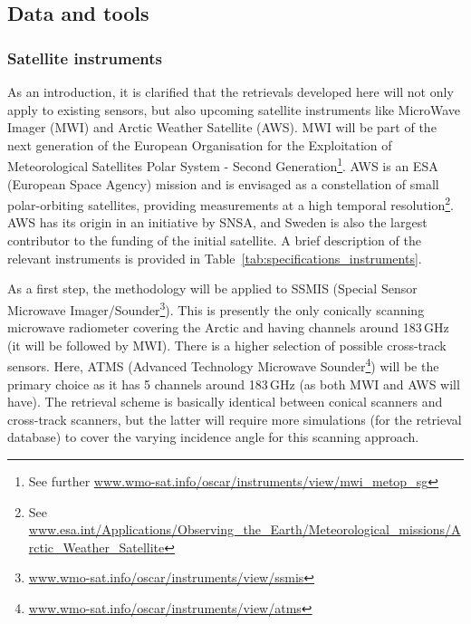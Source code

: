 \documentclass[12pt,oneside,a4paper]{article}
\begin{document}
\subsection{Data and tools}
% 
\subsubsection{Satellite instruments}

As an introduction, it is clarified that the retrievals developed here will not
only apply to existing sensors, but also upcoming satellite
instruments like MicroWave Imager (MWI) and Arctic Weather Satellite (AWS). MWI
will be part of the next generation of the European Organisation for the
Exploitation of Meteorological Satellites Polar System - Second
Generation\footnote{See further
  \url{www.wmo-sat.info/oscar/instruments/view/mwi_metop_sg}}. AWS is an ESA (European Space Agency)
mission and is envisaged as a constellation of small polar-orbiting satellites,
providing measurements at a high temporal resolution\footnote{See
  \url{www.esa.int/Applications/Observing_the_Earth/Meteorological_missions/Arctic_Weather_Satellite}}.
AWS has its origin in an initiative by SNSA, and Sweden is also the largest
contributor to the funding of the initial satellite. A brief description of the
relevant instruments is provided in Table~\ref{tab:specifications_instruments}.

As a first step, the methodology will be applied to SSMIS (Special Sensor
Microwave
Imager/Sounder\footnote{\url{www.wmo-sat.info/oscar/instruments/view/ssmis}}).
This is presently the only conically scanning microwave radiometer covering the
Arctic and having channels around 183\,GHz (it will be followed by MWI). There is a
higher selection of possible cross-track sensors. Here, ATMS (Advanced
Technology Microwave
Sounder\footnote{\url{www.wmo-sat.info/oscar/instruments/view/atms}}) will be
the primary choice as it has 5 channels around 183\,GHz (as both MWI and AWS
will have). The retrieval scheme is basically identical between conical
scanners and cross-track scanners, but the latter will require more simulations
(for the retrieval database) to cover the varying incidence angle for this
scanning approach.
\end{document}
